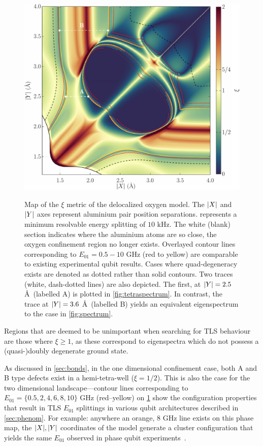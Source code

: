 \begin{figure}[htp]
\includegraphics[width=\textwidth]{figures/xiunbound}\\
\caption[$\xi$ Metric Phase Map, Unbound in $z$]{\label{fig:xiunbound}Map of the $\xi$ metric of the delocalized oxygen  model. The $\lvert X\rvert$ and $\lvert Y\rvert$ axes represent aluminium pair position separations.  represents a minimum resolvable energy splitting of $10$ kHz. The white (blank) section indicates where the aluminium atoms are so close, the oxygen confinement region no longer exists. Overlayed contour lines corresponding to $E_{01} = 0.5\!-\!10$ GHz (red to yellow) are comparable to existing experimental qubit results. Cases where quad-degeneracy exists are denoted as dotted rather than solid contours. Two traces (white, dash-dotted lines) are also depicted. The first, at $\lvert Y\rvert = 2.5$ \AA\ (labelled A) is plotted in \cref{fig:tetraspectrum}. In contrast, the trace at $\lvert Y\rvert = 3.6$ \AA\ (labelled B) yields an equivalent eigenspectrum to the  case in \cref{fig:spectrum}.}
\end{figure}

Regions that are deemed to be unimportant when searching for TLS behaviour are those where $\xi \geq 1$, as these correspond to eigenspectra which do not possess a (quasi-)doubly degenerate ground state.

As discussed in \cref{sec:bonds}, in the one dimensional confinement case, both A and B type defects exist in a hemi-tetra-well ($\xi = 1/2$).
This is also the case for the two dimensional landscape---contour lines corresponding to $E_{01} = \{0.5, 2, 4, 6, 8, 10\}$ GHz (red--yellow) on \cref{fig:xiunbound} show the configuration properties that result in TLS $E_{01}$ splittings in various qubit architectures described in \cref{sec:phenom}.
For example: anywhere an orange, $8$ GHz line exists on this phase map, the $\lvert X\rvert, \lvert Y\rvert$ coordinates of the model generate a cluster configuration that yields the same $E_{01}$ observed in phase qubit experiments~\cite{Cole2010}.

